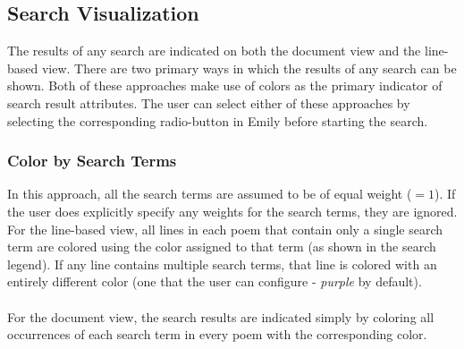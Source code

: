 \documentclass[10pt, twocolumn]{article}
\begin{document}
\subsection{Search Visualization}\label{sec:vis}
The results of any search are indicated on both the document view and the line-based view.  There are two primary ways in which the results of any search can be shown. Both of these approaches make use of colors as the primary indicator of search result attributes. The user can select either of these approaches by selecting the corresponding radio-button in Emily before starting the search. 
\subsubsection{Color by Search Terms}
 In this approach, all the search terms are assumed to be of equal weight ($=1$). If the user does explicitly specify any weights for the search terms, they are ignored. For the line-based view, all lines in each poem that contain only a single search term are colored using the color assigned to that term (as shown in the search legend). If any line contains multiple search terms, that line is colored with an entirely different color (one that the user can configure - \textit{purple} by default). \\ \\
 For the document view, the search results are indicated simply by coloring all occurrences of each search term in every poem with the corresponding color.
\end{document}
